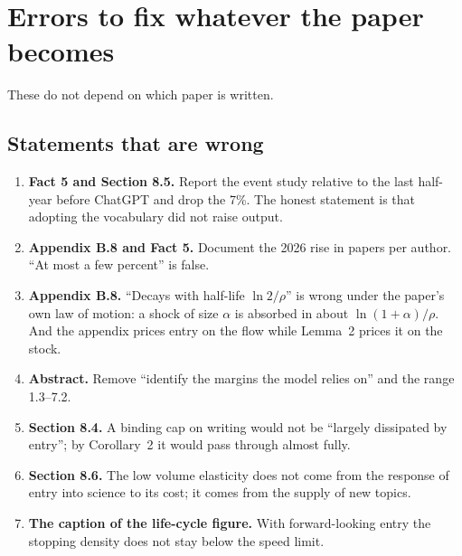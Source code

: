 \clearpage
\appendix
\renewcommand{\thesection}{\Alph{section}}
\renewcommand{\sectionmark}[1]{\markright{Appendix \thesection\enspace #1}}

\section{Errors to fix whatever the paper becomes}\label{sec:app-errors}

These do not depend on which paper is written.

\subsection*{Statements that are wrong}
\begin{enumerate}
\item \textbf{Fact 5 and Section 8.5.} Report the event study relative to the last half-year before ChatGPT and drop the 7\%. The honest statement is that adopting the vocabulary did not raise output.
\item \textbf{Appendix B.8 and Fact 5.} Document the 2026 rise in papers per author. ``At most a few percent'' is false.
\item \textbf{Appendix B.8.} ``Decays with half-life $\ln2/\rho$'' is wrong under the paper's own law of motion: a shock of size $\alpha$ is absorbed in about $\ln(1+\alpha)/\rho$. And the appendix prices entry on the flow while Lemma~2 prices it on the stock.
\item \textbf{Abstract.} Remove ``identify the margins the model relies on'' and the range 1.3--7.2.
\item \textbf{Section 8.4.} A binding cap on writing would not be ``largely dissipated by entry''; by Corollary~2 it would pass through almost fully.
\item \textbf{Section 8.6.} The low volume elasticity does not come from the response of entry into science to its cost; it comes from the supply of new topics.
\item \textbf{The caption of the life-cycle figure.} With forward-looking entry the stopping density does not stay below the speed limit.
\end{enumerate}

